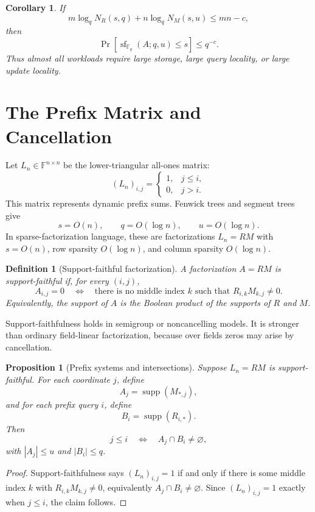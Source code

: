 \documentclass[11pt]{article}
\newtheorem{proposition}[theorem]{Proposition}
\newtheorem{definition}[theorem]{Definition}
\newtheorem{corollary}[theorem]{Corollary}
\begin{document}
\begin{corollary}
If
\[
m\log_q N_R(s,q)+n\log_q N_M(s,u)\le mn-c,
\]
then
\[
\Pr[\operatorname{sf}_{\mathbb F_q}(A;q,u)\le s]\le q^{-c}.
\]
Thus almost all workloads require large storage, large query locality, or large update locality.
\end{corollary}

\section{The Prefix Matrix and Cancellation}

Let $L_n\in\mathbb F^{n\times n}$ be the lower-triangular all-ones matrix:
\[
(L_n)_{i,j}
=
\begin{cases}
1,&j\le i,\\
0,&j>i.
\end{cases}
\]
This matrix represents dynamic prefix sums. Fenwick trees and segment trees give
\[
s=O(n),
\qquad
q=O(\log n),
\qquad
u=O(\log n).
\]
In sparse-factorization language, these are factorizations $L_n=RM$ with $s=O(n)$, row sparsity $O(\log n)$, and column sparsity $O(\log n)$.

\begin{definition}[Support-faithful factorization]
A factorization $A=RM$ is support-faithful if, for every $(i,j)$,
\[
A_{i,j}=0
\quad\Longleftrightarrow\quad
\text{there is no middle index }k\text{ such that }R_{i,k}M_{k,j}\ne0.
\]
Equivalently, the support of $A$ is the Boolean product of the supports of $R$ and $M$.
\end{definition}

Support-faithfulness holds in semigroup or noncancelling models. It is stronger than ordinary field-linear factorization, because over fields zeros may arise by cancellation.

\begin{proposition}[Prefix systems and intersections]
Suppose $L_n=RM$ is support-faithful. For each coordinate $j$, define
\[
A_j=\operatorname{supp}(M_{*,j}),
\]
and for each prefix query $i$, define
\[
B_i=\operatorname{supp}(R_{i,*}).
\]
Then
\[
j\le i
\quad\Longleftrightarrow\quad
A_j\cap B_i\ne\varnothing,
\]
with $|A_j|\le u$ and $|B_i|\le q$.
\end{proposition}

\begin{proof}
Support-faithfulness says $(L_n)_{i,j}=1$ if and only if there is some middle index $k$ with $R_{i,k}M_{k,j}\ne0$, equivalently $A_j\cap B_i\ne\varnothing$. Since $(L_n)_{i,j}=1$ exactly when $j\le i$, the claim follows.
\end{proof}
\end{document}
